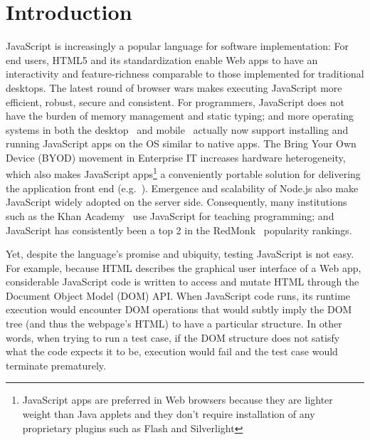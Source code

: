 \section{Introduction}
JavaScript is increasingly a popular language for software implementation: %
For end users, HTML5 and its standardization enable Web apps to have an interactivity and feature-richness comparable to those implemented for traditional desktops.  
The latest round of browser wars makes executing JavaScript more efficient, robust, secure and consistent.  
For programmers, JavaScript does not have the burden of memory management and static typing; and more operating systems in both the desktop~\cite{windows8javascript, chromeApps} 
and mobile~\cite{androidWebView, firefoxOS, tizen, blackberryWebWorks} actually now support installing and running JavaScript apps on the OS similar to native apps.
The Bring Your Own Device (BYOD) movement in Enterprise IT increases hardware heterogeneity, 
which also makes JavaScript apps\footnote{JavaScript apps are preferred in Web browsers because they are lighter weight than Java applets and they don't require installation of any proprietary plugins such as Flash and Silverlight} 
a conveniently portable solution for delivering the application front end (e.g.~\cite{BNSFoffice365}).
Emergence and scalability of Node.js also make JavaScript widely adopted on the server side.  
Consequently, many institutions such as the Khan Academy~\cite{khanAcademy} use JavaScript for teaching programming; and JavaScript has consistently been a top 2 in the RedMonk~\cite{redmonk} popularity rankings.%

Yet, despite the language's promise and ubiquity, testing JavaScript is not easy.  
For example, because HTML describes the graphical user interface of a Web app, considerable JavaScript code is written to access and mutate HTML through the Document Object Model (DOM) API.  
When JavaScript code runs, its runtime execution would encounter DOM operations that would subtly imply the DOM tree (and thus the webpage's HTML) to have a particular structure.  
In other words, when trying to run a test case, if the DOM structure does not satisfy what the code expects it to be, execution would fail and the test case would terminate prematurely.  

